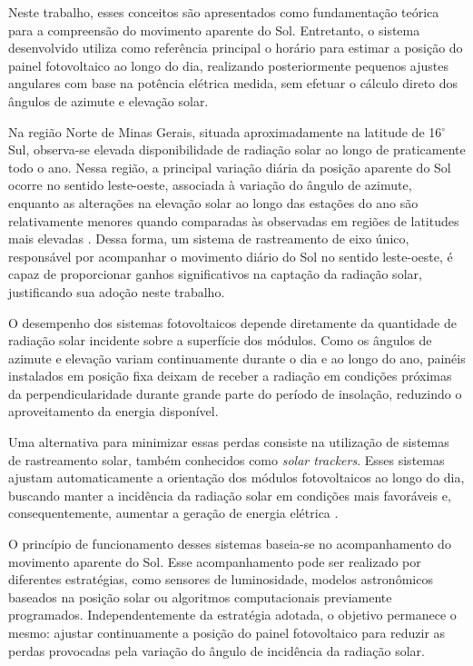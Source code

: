 Neste trabalho, esses conceitos são apresentados como fundamentação teórica para a compreensão do movimento aparente do Sol. Entretanto, o sistema desenvolvido utiliza como referência principal o horário para estimar a posição do painel fotovoltaico ao longo do dia, realizando posteriormente pequenos ajustes angulares com base na potência elétrica medida, sem efetuar o cálculo direto dos ângulos de azimute e elevação solar.

Na região Norte de Minas Gerais, situada aproximadamente na latitude de 16$^\circ$ Sul, observa-se elevada disponibilidade de radiação solar ao longo de praticamente todo o ano. Nessa região, a principal variação diária da posição aparente do Sol ocorre no sentido leste-oeste, associada à variação do ângulo de azimute, enquanto as alterações na elevação solar ao longo das estações do ano são relativamente menores quando comparadas às observadas em regiões de latitudes mais elevadas \cite{cemig2017}. Dessa forma, um sistema de rastreamento de eixo único, responsável por acompanhar o movimento diário do Sol no sentido leste-oeste, é capaz de proporcionar ganhos significativos na captação da radiação solar, justificando sua adoção neste trabalho.

O desempenho dos sistemas fotovoltaicos depende diretamente da quantidade de radiação solar incidente sobre a superfície dos módulos. Como os ângulos de azimute e elevação variam continuamente durante o dia e ao longo do ano, painéis instalados em posição fixa deixam de receber a radiação em condições próximas da perpendicularidade durante grande parte do período de insolação, reduzindo o aproveitamento da energia disponível.

Uma alternativa para minimizar essas perdas consiste na utilização de sistemas de rastreamento solar, também conhecidos como \textit{solar trackers}. Esses sistemas ajustam automaticamente a orientação dos módulos fotovoltaicos ao longo do dia, buscando manter a incidência da radiação solar em condições mais favoráveis e, consequentemente, aumentar a geração de energia elétrica \cite{verissimo2017}.

O princípio de funcionamento desses sistemas baseia-se no acompanhamento do movimento aparente do Sol. Esse acompanhamento pode ser realizado por diferentes estratégias, como sensores de luminosidade, modelos astronômicos baseados na posição solar ou algoritmos computacionais previamente programados. Independentemente da estratégia adotada, o objetivo permanece o mesmo: ajustar continuamente a posição do painel fotovoltaico para reduzir as perdas provocadas pela variação do ângulo de incidência da radiação solar.

